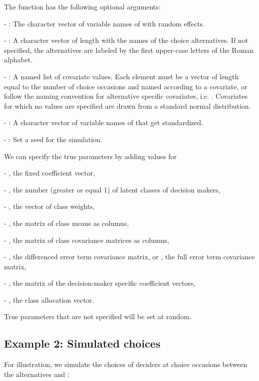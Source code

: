 \documentclass[article]{jss}
\newcommand{\fct}[1]{\code{#1()}}
\begin{document}
The function \fct{simulate\_choices} has the following optional arguments:

- : The character vector of variable names of  with random effects.

- : A character vector of length  with the names of the choice alternatives. If not specified, the alternatives are labeled by the first  upper-case letters of the Roman alphabet.

- : A named list of covariate values. Each element must be a vector of length equal to the number of choice occasions and named according to a covariate, or follow the naming convention for alternative specific covariates, i.e. . Covariates for which no values are specified are drawn from a standard normal distribution.

- : A character vector of variable names of  that get standardized.

- : Set a seed for the simulation.

We can specify the true parameters by adding values for

- , the fixed coefficient vector,

- , the number (greater or equal 1) of latent classes of decision makers,

- , the vector of class weights,

- , the matrix of class means as columns,

- , the matrix of class covariance matrices as columns,

- , the differenced error term covariance matrix, or , the full error term covariance matrix,

- , the matrix of the decision-maker specific coefficient vectors,

- , the class allocation vector.

True parameters that are not specified will be set at random.

\subsection{Example 2: Simulated choices} \label{subsec:example_simulated_choices}

For illustration, we simulate the choices of  deciders at  choice occasions between the alternatives  and :
\end{document}
